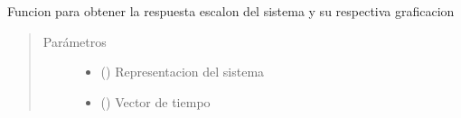 \documentclass[letterpaper,10pt,spanish]{sphinxmanual}
\begin{document}
\begin{fulllineitems}
\label{\detokenize{codigos/rutinas_analisis:rutinas_analisis.rutina_step_plot}}
Funcion para obtener la respuesta escalon del sistema y su respectiva graficacion
\begin{quote}\begin{description}
\item[{Parámetros}] \leavevmode\begin{itemize}
\item {} 
 () \textendash{} Representacion del sistema

\item {} 
 () \textendash{} Vector de tiempo

\end{itemize}

\end{description}\end{quote}

\end{fulllineitems}

\end{document}
